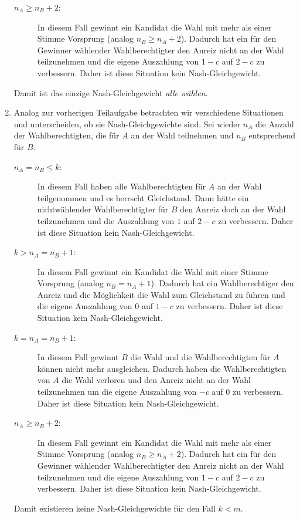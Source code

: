 \begin{enumerate}
\begin{description}
      \item[$n_A \geq n_B + 2$:] In diesem Fall gewinnt ein Kandidat die Wahl mit mehr als
        einer Stimme Vorsprung (analog $n_B \geq n_A+2$).
        Dadurch hat ein für den Gewinner wählender Wahlberechtigter den Anreiz nicht an
        der Wahl teilzunehmen und die eigene Auszahlung von $1-c$ auf $2-c$ zu verbessern.
        Daher ist diese Situation kein Nash-Gleichgewicht.
    \end{description}
    Damit ist das einzige Nash-Gleichgewicht \emph{alle wählen}.

  \item Analog zur vorherigen Teilaufgabe betrachten wir verschiedene Situationen und
    unterscheiden, ob sie Nash-Gleichgewichte sind.
    Sei wieder $n_A$ die Anzahl der Wahlberechtigten, die für $A$ an der Wahl teilnehmen
    und $n_B$ entsprechend für $B$.

    \begin{description}
      \item[$n_A = n_B \leq k$:] In diesem Fall haben alle Wahlberechtigten für $A$ an der
        Wahl teilgenommen und es herrscht Gleichstand.
        Dann hätte ein nichtwählender Wahlberechtigter für $B$ den Anreiz doch an der Wahl
        teilzunehmen und die Auszahlung von $1$ auf $2-c$ zu verbessern.
        Daher ist diese Situation kein Nash-Gleichgewicht.

      \item[$k > n_A = n_B + 1$:] In diesem Fall gewinnt ein Kandidat die Wahl mit einer
        Stimme Vorsprung (analog $n_B = n_A + 1$).
        Dadurch hat ein Wahlberechtiger den Anreiz und die Möglichkeit die Wahl zum
        Gleichstand zu führen und die eigene Auszahlung von $0$ auf $1-c$ zu verbessern.
        Daher ist diese Situation kein Nash-Gleichgewicht.

      \item[$k = n_A = n_B + 1$:] In diesem Fall gewinnt $B$ die Wahl und die
        Wahlberechtigten für $A$ können nicht mehr ausgleichen.
        Dadurch haben die Wahlberechtigten von $A$ die Wahl verloren und den Anreiz nicht
        an der Wahl teilzunehmen um die eigene Auszahlung von $-c$ auf $0$ zu verbessern.
        Daher ist diese Situation kein Nash-Gleichgewicht.

      \item[$n_A \geq n_B + 2$:] In diesem Fall gewinnt ein Kandidat die Wahl mit mehr als
        einer Stimme Vorsprung (analog $n_B \geq n_A+2$).
        Dadurch hat ein für den Gewinner wählender Wahlberechtigter den Anreiz nicht an
        der Wahl teilzunehmen und die eigene Auszahlung von $1-c$ auf $2-c$ zu verbessern.
        Daher ist diese Situation kein Nash-Gleichgewicht.
    \end{description}

    Damit existieren keine Nash-Gleichgewichte für den Fall $k<m$.
\end{enumerate}
